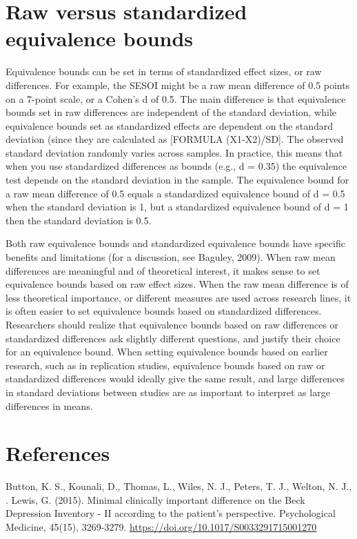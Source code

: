 \documentclass[english,man]{apa6}
\theoremstyle{definition}
\theoremstyle{definition}
\theoremstyle{definition}
\theoremstyle{remark}
\begin{document}
\section{Raw versus standardized equivalence
bounds}\label{raw-versus-standardized-equivalence-bounds}

Equivalence bounds can be set in terms of standardized effect sizes, or
raw differences. For example, the SESOI might be a raw mean difference
of 0.5 points on a 7-point scale, or a Cohen's d of 0.5. The main
difference is that equivalence bounds set in raw differences are
independent of the standard deviation, while equivalence bounds set as
standardized effects are dependent on the standard deviation (since they
are calculated as {[}FORMULA (X1-X2)/SD{]}. The observed standard
deviation randomly varies across samples. In practice, this means that
when you use standardized differences as bounds (e.g., d = 0.35) the
equivalence test depends on the standard deviation in the sample. The
equivalence bound for a raw mean difference of 0.5 equals a standardized
equivalence bound of d = 0.5 when the standard deviation is 1, but a
standardized equivalence bound of d = 1 then the standard deviation is
0.5.

Both raw equivalence bounds and standardized equivalence bounds have
specific benefits and limitations (for a discussion, see Baguley, 2009).
When raw mean differences are meaningful and of theoretical interest, it
makes sense to set equivalence bounds based on raw effect sizes. When
the raw mean difference is of less theoretical importance, or different
measures are used across research lines, it is often easier to set
equivalence bounds based on standardized differences. Researchers should
realize that equivalence bounds based on raw differences or standardized
differences ask slightly different questions, and justify their choice
for an equivalence bound. When setting equivalence bounds based on
earlier research, such as in replication studies, equivalence bounds
based on raw or standardized differences would ideally give the same
result, and large differences in standard deviations between studies are
as important to interpret as large differences in means.

\newpage

\section{References}\label{references}

Button, K. S., Kounali, D., Thomas, L., Wiles, N. J., Peters, T. J.,
Welton, N. J., . Lewis, G. (2015). Minimal clinically important
difference on the Beck Depression Inventory - II according to the
patient's perspective. Psychological Medicine, 45(15), 3269-3279.
\url{https://doi.org/10.1017/S0033291715001270}
\end{document}
